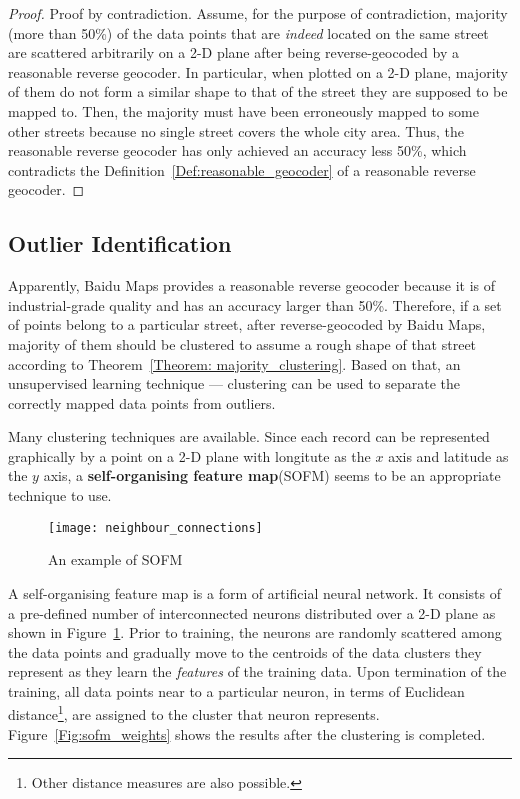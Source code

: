 \begin{proof}
Proof by contradiction. Assume, for the purpose of contradiction, majority (more than 50\%) of the data points that are \emph{indeed} located on the same street are scattered arbitrarily on a 2-D plane after being reverse-geocoded by a reasonable reverse geocoder. In particular, when plotted on a 2-D plane, majority of them do not form a similar shape to that of the street they are supposed to be mapped to. Then, the majority must have been erroneously mapped to some other streets because no single street covers the whole city area. Thus, the reasonable reverse geocoder has only achieved an accuracy less 50\%, which contradicts the Definition~\ref{Def:reasonable_geocoder} of a reasonable reverse geocoder. 
\end{proof}

\subsection{Outlier Identification}
Apparently, Baidu Maps provides a reasonable reverse geocoder because it is of industrial-grade quality and has an accuracy larger than 50\%. Therefore, if a set of points belong to a particular street, after reverse-geocoded by Baidu Maps, majority of them should be clustered to assume a rough shape of that street according to Theorem~\ref{Theorem: majority_clustering}. Based on that, an unsupervised learning technique --- clustering can be used to separate the correctly mapped data points from outliers. 

Many clustering techniques are available\cite{LO05}. Since each record can be represented graphically by a point on a 2-D plane with longitute as the $x$ axis and latitude as the $y$ axis, a \textbf{self-organising feature map}\cite{TK82}(SOFM) seems to be an appropriate technique to use. 

\begin{figure}[h]
\texttt{[image: neighbour\_connections]}
\centering
\caption{An example of SOFM}\label{Fig:neighbour_connections}
\end{figure}

A self-organising feature map is a form of artificial neural network. It consists of a pre-defined number of interconnected neurons distributed over a 2-D plane as shown in Figure~\ref{Fig:neighbour_connections}. Prior to training, the neurons are randomly scattered among the data points and gradually move to the centroids of the data clusters they represent as they learn the \emph{features} of the training data. Upon termination of the training, all data points near to a particular neuron, in terms of Euclidean distance\footnote{Other distance measures are also possible.}, are assigned to the cluster that neuron represents. Figure~\ref{Fig:sofm_weights} shows the results after the clustering is completed. 


